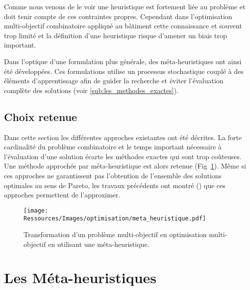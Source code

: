 Comme nous venons de le voir une heuristique est fortement liée au problème et doit tenir
compte de ces contraintes propres. Cependant dans l’optimisation multi-objectif combinatoire
appliqué au bâtiment cette connaissance et souvent trop limité et la définition d’une
heuristique risque d’amener un biais trop important.

Dans l’optique d’une formulation plus générale, des méta-heuristiques ont ainsi été développées.
Ces formulations utilise un processus stochastique couplé à des éléments d’apprentissage
afin de guider la recherche et éviter l’évaluation complète des solutions (voir \ref{sub:les_methodes_exactes}).



\subsection{Choix retenue} %
\label{sub:choix_retenue}
Dans cette section les différentes approches existantes ont été décrites. La forte
cardinalité du problème combinatoire et le temps important nécessaire à l’évaluation d’une
solution écarte les méthodes exactes qui sont trop coûteuses. Une méthode approchée par
méta-heuristique est alors retenue (Fig~\ref{fig:multi_meta}). Même si ces approches ne
garantissent pas l’obtention de l’ensemble des solutions optimales au sens de Pareto, les
travaux précédents ont montré () que ces approches permettent de
l’approximer.

\begin{figure}
    \begin{center}
        \texttt{[image: Ressources/Images/optimisation/meta\_heuristique.pdf]}
    \end{center}
    \caption{Transformation d’un problème multi-objectif en optimisation
             multi-objectif en utilisant une méta-heuristique.
             \label{fig:multi_meta}}
\end{figure}




\section{Les Méta-heuristiques} %
\label{sec:les_meta_heuristiques}
